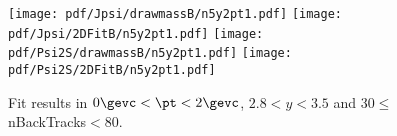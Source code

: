 \begin{figure}[H]
\begin{center}
\texttt{[image: pdf/Jpsi/drawmassB/n5y2pt1.pdf]}
\texttt{[image: pdf/Jpsi/2DFitB/n5y2pt1.pdf]}
\vspace*{-0.5cm}
\texttt{[image: pdf/Psi2S/drawmassB/n5y2pt1.pdf]}
\texttt{[image: pdf/Psi2S/2DFitB/n5y2pt1.pdf]}
\vspace*{-0.5cm}
\end{center}
\caption{Fit results in $0\gevc<\pt<2\gevc$, $2.8<y<3.5$ and 30$\leq$nBackTracks$<$80.}
\label{Fitn5y2pt1}
\end{figure}
